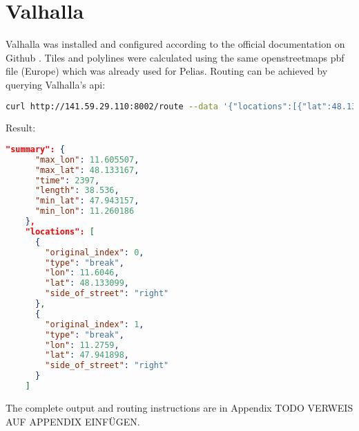 
\section{Valhalla}
Valhalla was installed and configured according to the official documentation on Github \cite{Knisely2019}.
Tiles and polylines were calculated using the same openstreetmaps pbf file (Europe) which was already used for Pelias. Routing can be achieved by querying Valhalla’s api:

\begin{lstlisting}[language=bash,breaklines=true]
curl http://141.59.29.110:8002/route --data '{"locations":[{"lat":48.1331,"lon":11.6046,"type":"break"},{"lat":47.9419,"lon":11.2759,"type":"break"}],"costing":"auto","directions_options":{"units":"km"}}' | jq '.'
\end{lstlisting}

Result:

\begin{lstlisting}[language=json,breaklines=true]
    "summary": {
      "max_lon": 11.605507,
      "max_lat": 48.133167,
      "time": 2397,
      "length": 38.536,
      "min_lat": 47.943157,
      "min_lon": 11.260186
    },
    "locations": [
      {
        "original_index": 0,
        "type": "break",
        "lon": 11.6046,
        "lat": 48.133099,
        "side_of_street": "right"
      },
      {
        "original_index": 1,
        "type": "break",
        "lon": 11.2759,
        "lat": 47.941898,
        "side_of_street": "right"
      }
    ]
\end{lstlisting}

The complete output and routing instructions are in Appendix TODO VERWEIS AUF APPENDIX EINFÜGEN.